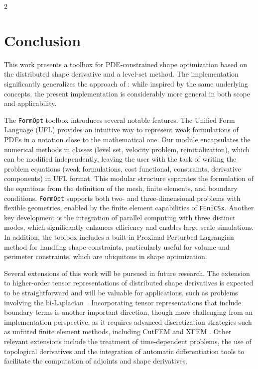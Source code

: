 \documentclass[a4paper, oneside]{article}
\newcommand{\fopt}{\texttt{FormOpt} }
\newcommand{\fx}{\texttt{FEniCSx}}
\begin{document}
\begin{multicols}{2}
\section{Conclusion}
\vspace{-0.2cm}
This work presents a toolbox for PDE-constrained shape optimization based on the distributed shape derivative and a level-set method.
The implementation significantly generalizes the approach of \cite{MR3843884}: while inspired by the same underlying concepts, the present implementation is considerably more general in both scope and applicability.

The \fopt toolbox introduces several notable features.
The Unified Form Language (UFL) provides an intuitive way to represent weak formulations of PDEs in a notation close to the mathematical one. 
Our module encapsulates the numerical methods in classes
(level set, velocity problem, reinitialization),
which can be modified independently,
leaving the user with the task of writing the problem equations
(weak formulations, cost functional, constraints, derivative components)
in UFL format.
This modular structure separates the formulation of the equations from the definition of the mesh, finite elements, and boundary conditions.
\fopt  supports both two- and three-dimensional problems with flexible geometries, enabled by the finite element capabilities of \fx. Another key development is the integration of parallel computing with three distinct modes, which significantly enhances efficiency and enables large-scale simulations. In addition, the toolbox includes a built-in Proximal-Perturbed Lagrangian method for handling shape constraints, particularly useful for volume and perimeter constraints, which are ubiquitous in shape optimization.

Several extensions of this work will be pursued in future research. The extension to higher-order tensor representations of distributed shape derivatives is expected to be straightforward and will be valuable for applications, such as problems involving the bi-Laplacian~\cite{LL2024}. Incorporating tensor representations that include boundary terms is another important direction, though more challenging from an implementation perspective, as it requires advanced discretization strategies such as unfitted finite element methods, including CutFEM \cite{Burman1} and XFEM \cite{belytschko2001arbitrary}. 
Other relevant extensions include the treatment of time-dependent problems, the use of topological derivatives \cite{MR4916810,Novotny2013} and the integration of automatic differentiation tools \cite{Allaire2024,BLAUTH2023101577,MR4233697,Ham2019,Paganini2021} to facilitate the computation of adjoints and shape derivatives.

\end{multicols} 



\end{document}
